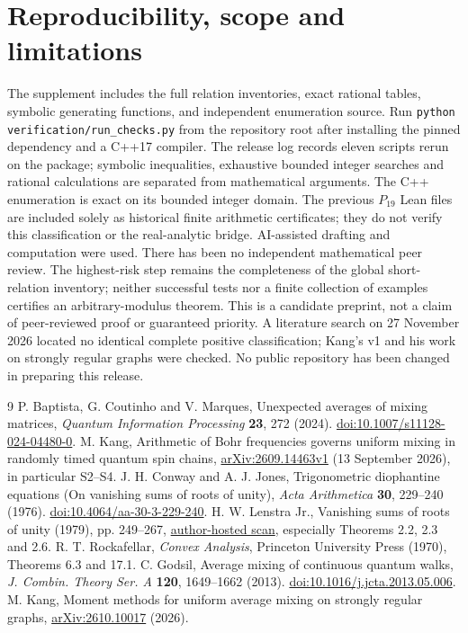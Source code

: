 \documentclass[11pt]{article}
\begin{document}
\section{Reproducibility, scope and limitations}
The supplement includes the full relation inventories, exact rational tables, symbolic generating functions, and independent enumeration source. Run \texttt{python verification/run\_checks.py} from the repository root after installing the pinned dependency and a C++17 compiler. The release log records eleven scripts rerun on the package; symbolic inequalities, exhaustive bounded integer searches and rational calculations are separated from mathematical arguments. The C++ enumeration is exact on its bounded integer domain. The previous $P_{19}$ Lean files are included solely as historical finite arithmetic certificates; they do not verify this classification or the real-analytic bridge. AI-assisted drafting and computation were used. There has been no independent mathematical peer review. The highest-risk step remains the completeness of the global short-relation inventory; neither successful tests nor a finite collection of examples certifies an arbitrary-modulus theorem. This is a candidate preprint, not a claim of peer-reviewed proof or guaranteed priority. A literature search on 27 November 2026 located no identical complete positive classification; Kang's v1 and his work on strongly regular graphs \cite{kang2} were checked. No public repository has been changed in preparing this release.
\clearpage
\begin{thebibliography}{9}\small
{} P. Baptista, G. Coutinho and V. Marques, Unexpected averages of mixing matrices, \emph{Quantum Information Processing} \textbf{23}, 272 (2024). \href{https://doi.org/10.1007/s11128-024-04480-0}{doi:10.1007/s11128-024-04480-0}.
 M. Kang, Arithmetic of Bohr frequencies governs uniform mixing in randomly timed quantum spin chains, \href{https://arxiv.org/abs/2609.14463}{arXiv:2609.14463v1} (13 September 2026), in particular S2--S4.
 J. H. Conway and A. J. Jones, Trigonometric diophantine equations (On vanishing sums of roots of unity), \emph{Acta Arithmetica} \textbf{30}, 229--240 (1976). \href{https://doi.org/10.4064/aa-30-3-229-240}{doi:10.4064/aa-30-3-229-240}.
 H. W. Lenstra Jr., Vanishing sums of roots of unity (1979), pp. 249--267, \href{https://pub.math.leidenuniv.nl/~lenstrahw/PUBLICATIONS/1979d/art.pdf}{author-hosted scan}, especially Theorems 2.2, 2.3 and 2.6.
 R. T. Rockafellar, \emph{Convex Analysis}, Princeton University Press (1970), Theorems 6.3 and 17.1.
 C. Godsil, Average mixing of continuous quantum walks, \emph{J. Combin. Theory Ser. A} \textbf{120}, 1649--1662 (2013). \href{https://doi.org/10.1016/j.jcta.2013.05.006}{doi:10.1016/j.jcta.2013.05.006}.
 M. Kang, Moment methods for uniform average mixing on strongly regular graphs, \href{https://arxiv.org/abs/2610.10017}{arXiv:2610.10017} (2026).
\end{thebibliography}
\end{document}
